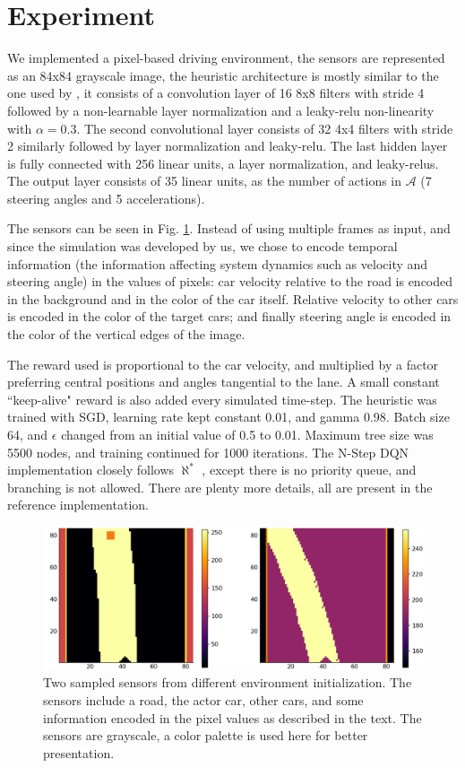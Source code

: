 \documentclass{article}
\newcommand{\alephstar}{$\aleph^*$ }
\begin{document}
\section{Experiment}
\label{sec:experiment}

We implemented a pixel-based driving environment, the sensors are represented as an 84x84 grayscale image, the heuristic architecture is mostly similar to the one used by \cite{mnih2013playing}, it consists of a convolution layer of 16 8x8 filters with stride 4 followed by a non-learnable layer normalization \citep{ba2016layer} and a leaky-relu non-linearity \citep{xu2015empirical} with $\alpha=0.3$. The second convolutional layer consists of 32 4x4 filters with stride 2 similarly followed by layer normalization and leaky-relu. The last hidden layer is fully connected with 256 linear units, a layer normalization, and leaky-relus. The output layer consists of 35 linear units, as the number of actions in $\mathcal{A}$ (7 steering angles and 5 accelerations).

The sensors can be seen in Fig. \ref{fig:sensors}. Instead of using multiple frames as input, and since the simulation was developed by us, we chose to encode temporal information (the information affecting system dynamics such as velocity and steering angle) in the values of pixels: car velocity relative to the road is encoded in the background and in the color of the car itself. Relative velocity to other cars is encoded in the color of the target cars; and finally steering angle is encoded in the color of the vertical edges of the image.

The reward used is proportional to the car velocity, and multiplied by a factor preferring central positions and angles tangential to the lane. A small constant ``keep-alive" reward is also added every simulated time-step. The heuristic was trained with SGD, learning rate kept constant 0.01, and gamma 0.98. Batch size 64, and $\epsilon$ changed from an initial value of 0.5 to 0.01. Maximum tree size was 5500 nodes, and training continued for 1000 iterations. The N-Step DQN implementation closely follows \alephstar, except there is no priority queue, and branching is not allowed. There are plenty more details, all are present in the reference implementation.

\begin{figure}
  \centering
  \includegraphics[width=1.0\textwidth]{images/sensors.png}
  \caption{Two sampled sensors from different environment initialization. The sensors include a road, the actor car, other cars, and some information encoded in the pixel values as described in the text. The sensors are grayscale, a color palette is used here for better presentation. }
  \label{fig:sensors}
\end{figure}
\end{document}
